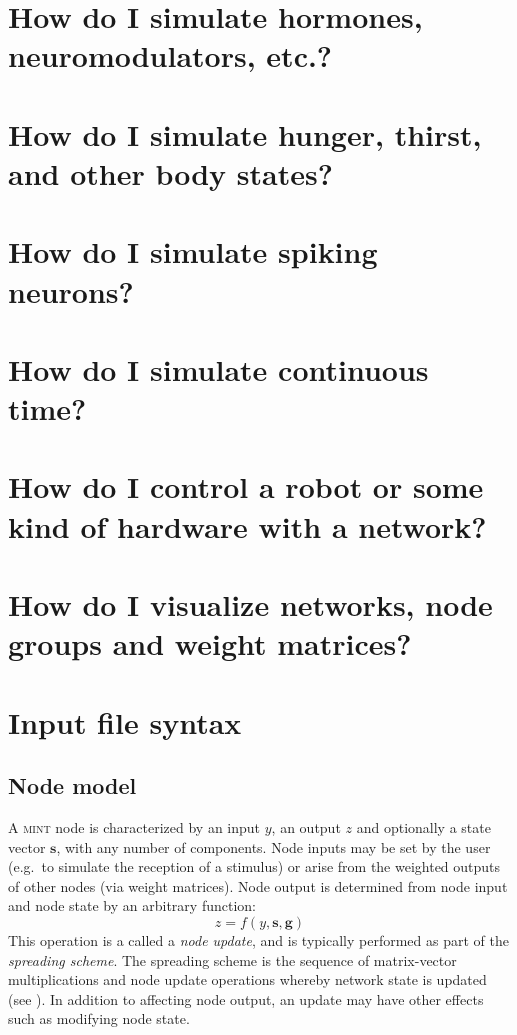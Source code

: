 \documentclass[12pt,letterpaper]{memoir}
\let\fref\relax%
\newcommand{\mint}{{\scshape\sffamily mint}\xspace}
\renewcommand{\vec}[1]{\ensuremath{\mathbf#1}\xspace}
\begin{document}
\section{How do I simulate hormones, neuromodulators, etc.?}
\label{sec:hormones-etc}

\section{How do I simulate  hunger, thirst, and other body states?}
\label{sec:body-states}

\section{How do I simulate spiking neurons?}
\label{sec:spiking}

\section{How do I simulate continuous time?}
\label{sec:continuous-time}

\section{How do I control a robot or some kind of hardware with a network?}
\label{sec:hardware-control}

\section{How do I visualize networks, node groups and weight
  matrices?}
\label{sec:network-analysis}

\section{Input file syntax}

\subsection{Node model}
\label{sec:nodemodel}
A \mint node is characterized by an input $y$, an output $z$ and
optionally a state vector $\vec s$, with any number of components.
Node inputs may be set by the user (e.g.\ to simulate the reception of
a stimulus) or arise from the weighted outputs of other nodes (via
weight matrices). Node output is determined from node input and node
state by an arbitrary function:
\begin{equation}
  \label{eq:node-model}
  z = f( y, \vec s, \vec g )
\end{equation}
This operation is a called a \textit{node update}, and is typically
performed as part of the \textit{spreading scheme}. The spreading
scheme is the sequence of matrix-vector multiplications and node
update operations whereby network state is updated (see
\fref{sec:spreading}). In addition to affecting node output, an update
may have other effects such as modifying node state.
\end{document}
